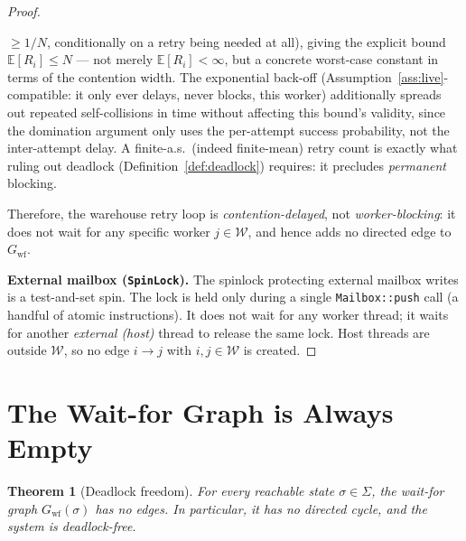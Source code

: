 \documentclass[11pt,a4paper]{article}
\newtheorem{theorem}{Theorem}[section]
\newcommand{\code}[1]{\texttt{#1}}
\begin{document}
\begin{proof}
\begin{itemize}
        $\geq 1/N$, conditionally on a retry being needed at all), giving
        the explicit bound $\mathbb{E}[R_i] \leq N$ --- not merely
        $\mathbb{E}[R_i]<\infty$, but a concrete worst-case constant in
        terms of the contention width. The exponential back-off
        (Assumption~\ref{ass:live}-compatible: it only ever delays,
        never blocks, this worker) additionally spreads out repeated
        self-collisions in time without affecting this bound's validity,
        since the domination argument only uses the per-attempt success
        probability, not the inter-attempt delay.
        A finite-a.s.\ (indeed finite-mean) retry count is exactly what
        ruling out deadlock (Definition~\ref{def:deadlock}) requires: it
        precludes \emph{permanent} blocking.
\end{itemize}
Therefore, the warehouse retry loop is \emph{contention-delayed}, not
\emph{worker-blocking}: it does not wait for any specific worker
$j \in \mathcal{W}$, and hence adds no directed edge to $G_{\text{wf}}$.

\medskip
\textbf{External mailbox (\code{SpinLock}).}
The spinlock protecting external mailbox writes is a test-and-set
spin.  The lock is held only during a single \code{Mailbox::push}
call (a handful of atomic instructions).  It does not wait for any
worker thread; it waits for another \emph{external (host)} thread
to release the same lock.  Host threads are outside $\mathcal{W}$,
so no edge $i \to j$ with $i, j \in \mathcal{W}$ is created.
\end{proof}

\section{The Wait-for Graph is Always Empty}

\begin{theorem}[Deadlock freedom]
\label{thm:deadlock}
For every reachable state $\sigma \in \Sigma$, the wait-for graph
$G_{\text{wf}}(\sigma)$ has no edges.  In particular, it has no
directed cycle, and the system is deadlock-free.
\end{theorem}
\end{document}
